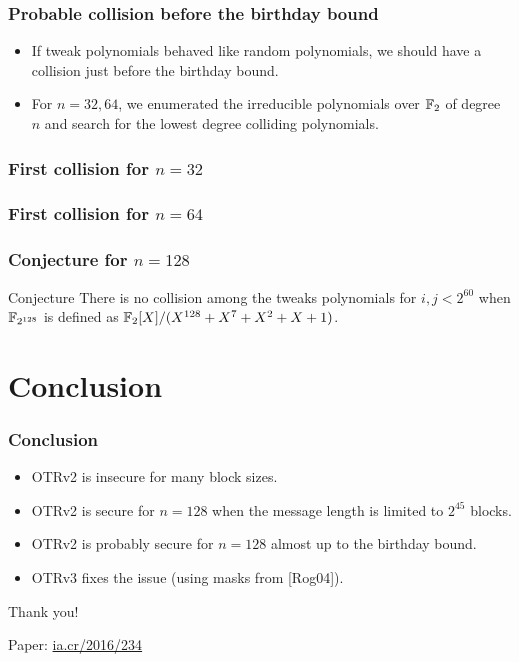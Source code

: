 \documentclass{beamer}
\begin{document}
	\begin{frame}
		\frametitle{Probable collision before the birthday bound}

		\begin{itemize}
			\item If tweak polynomials behaved like random polynomials, we should have a collision just before the birthday bound.
			
			\item For $n = 32, 64$, we enumerated the irreducible polynomials over $\mathbb{F}_2$ of degree $n$ and search for the lowest degree colliding polynomials.
		\end{itemize}
		
	\end{frame}



	\begin{frame}
		\frametitle{First collision for $n=32$}
		
		\centering
		\scalebox{0.8}{
			
			}
	\end{frame}
	\begin{frame}
		\frametitle{First collision for $n=64$}
		
		\centering
		\scalebox{0.8}{
			
			}
	\end{frame}


	\begin{frame}
		\frametitle{Conjecture for $n=128$}
		
		\begin{block}{Conjecture}
			There is no collision among the tweaks polynomials for $i, j < 2^{60}$ when $\mathbb{F}_{2^{128}}$ is defined as $\mathbb{F}_2[X]/(X^{128}+X^{7}+X^{2}+X+1)$.
		\end{block}
	\end{frame}


\section*{Conclusion} %
\label{sec:conclusion}

	\begin{frame}
		\frametitle{Conclusion}
		
		\begin{itemize}
			\item OTRv2 is insecure for many block sizes.
			\item OTRv2 is secure for $n = 128$ when the message length is limited to $2^{45}$ blocks.
			\item OTRv2 is probably secure for $n = 128$ almost up to the birthday bound.
			\item OTRv3 fixes the issue (using masks from [Rog04]).
		\end{itemize}
	\end{frame}


	\begin{frame}

		\begin{center}
			{\Large Thank you!}
			
			\vspace{1cm}
			Paper: \href{http://ia.cr/2016/234}{ia.cr/2016/234}
		\end{center}
	\end{frame}
	
\end{document}
